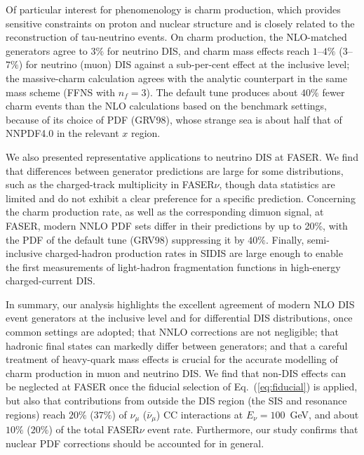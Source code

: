 Of particular interest for phenomenology is charm production, which provides sensitive constraints on proton and nuclear structure and is closely related to the reconstruction of tau-neutrino events.
%
On charm production, the NLO-matched generators agree to $3\%$ for neutrino DIS, and charm mass effects reach $1$--$4\%$ ($3$--$7\%$) for neutrino (muon) DIS against a sub-per-cent effect at the inclusive level; the massive-charm \powhegtwo calculation agrees with the analytic \yadism counterpart in the same mass scheme (FFNS with $n_f=3$).
%
The default \genie tune produces about $40\%$ fewer charm events than the NLO calculations based on the benchmark settings, because of its choice of PDF (GRV98), whose strange sea is about half that of NNPDF4.0 in the relevant $x$ region. 

We also presented representative applications to neutrino DIS at FASER.
%
We find that differences between generator predictions are large for some distributions, such as the charged-track multiplicity in FASER$\nu$, though data statistics are limited and do not exhibit a clear preference for a specific prediction. 
%
Concerning the charm production rate, as well as the corresponding dimuon signal, at FASER, modern NNLO PDF sets differ in their predictions by up to 20\%, with the PDF of the default \genie tune (GRV98) suppressing it by $40\%$.
%
Finally, semi-inclusive charged-hadron production rates in SIDIS are large enough to enable the first measurements of light-hadron fragmentation functions in high-energy charged-current DIS. 

In summary, our analysis highlights the excellent agreement of modern NLO DIS event generators at the inclusive level and for differential DIS distributions, once common settings are adopted; that NNLO corrections are not negligible; that hadronic final states can markedly differ between generators; and that a careful treatment of heavy-quark mass effects is crucial for the accurate modelling of charm production in muon and neutrino DIS. 
%
We find that non-DIS effects can be neglected at FASER once the fiducial selection of Eq.~(\ref{eq:fiducial}) is applied, but also that contributions from outside the DIS region (the SIS and resonance regions) reach $20\%$ ($37\%$) of $\nu_\mu$ ($\bar\nu_\mu$) CC interactions at $E_\nu=100$~GeV, and about $10\%$ ($20\%$) of the total FASER$\nu$ event rate.
%
Furthermore, our study confirms that  nuclear PDF corrections should be accounted for in general.

